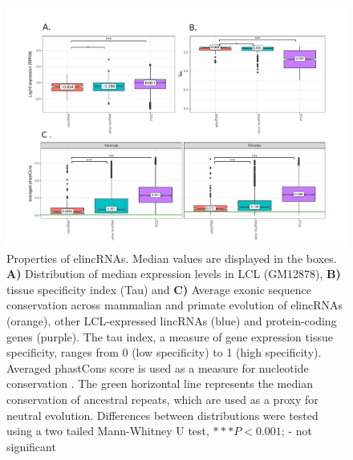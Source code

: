 \documentclass[11pt,a4paper]{report}
\begin{document}
\begin{figure}[ht]
	\includegraphics[width=1\textwidth]{Figures/1_full_characterization_elincRNA.pdf}
	\caption{Properties of elincRNAs. Median values are displayed in the boxes. \textbf{A)} Distribution of median expression levels in LCL (GM12878), \textbf{B)} tissue specificity index (Tau) and \textbf{C)} Average exonic sequence conservation across mammalian and primate evolution of elincRNAs (orange), other LCL-expressed lincRNAs (blue) and protein-coding genes (purple). The tau index, a measure of gene expression tissue specificity, ranges from 0 (low specificity) to 1 (high specificity)\cite{Kryuchkova2015a}. Averaged phastCons score is used as a measure for nucleotide conservation \cite{Siepel2005}. The green horizontal line represents the median conservation of ancestral repeats, which are used as a proxy for neutral evolution. Differences between distributions were tested using a two tailed Mann-Whitney U test, $***P<0.001$; - not significant}
	\label{charac_elinc}
\end{figure}
\end{document}
